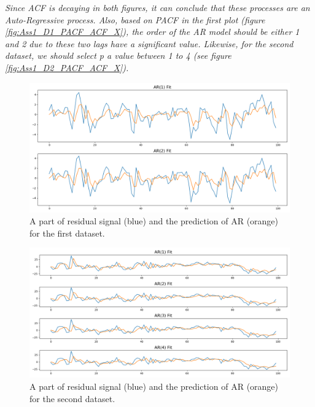 \textit{Since \gls{ACF} is decaying in both figures, it can conclude that these processes are an Auto-Regressive process. Also, based on \gls{PACF} in the first plot (figure \ref{fig:Ass1_D1_PACF_ACF_X}), the order of the \gls{AR} model should be either 1 and 2 due to these two lags have a significant value. Likewise, for the second dataset, we should select p a value between 1 to 4 (see figure \ref{fig:Ass1_D2_PACF_ACF_X}).}

\begin{figure}[H]
    \centering
    \begin{minipage}[b]{1\textwidth}
        \includegraphics[width=\textwidth]{figures/Ass1/Ass1_D1_ARs models.png}
    \end{minipage}
    \caption{A part of residual signal (blue) and the prediction of \gls{AR} (orange) for the first dataset.}
    \label{fig:Ass1_D1_ARs_models}
\end{figure}

\begin{figure}[H]
    \centering
    \begin{minipage}[b]{1\textwidth}
        \includegraphics[width=\textwidth]{figures/Ass1/Ass1_D2_ARs models.png}
    \end{minipage}
    \caption{A part of residual signal (blue) and the prediction of \gls{AR} (orange) for the second dataset.}
    \label{fig:Ass1_D2_ARs_models}
\end{figure}


